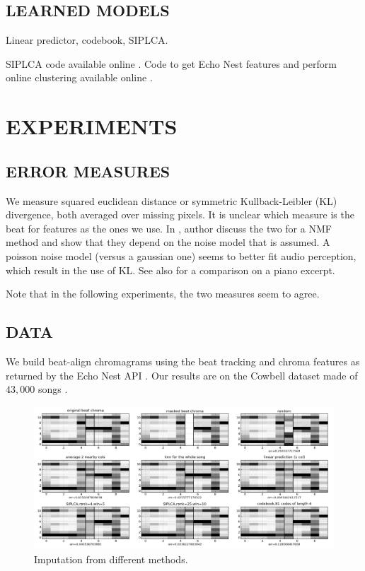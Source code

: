 \documentclass{article}
\begin{document}
\subsection{LEARNED MODELS}
\label{ssec:learnedmodels}

Linear predictor, codebook, SIPLCA.

SIPLCA code available online \cite{Weiss2010}. Code to get Echo Nest features and perform
online clustering available online \cite{Bertin-Mahieux2010a}.

\section{EXPERIMENTS}
\label{sec:experiments}

\subsection{ERROR MEASURES}
\label{ssec:errmeasures}
We measure squared euclidean distance or symmetric Kullback-Leibler (KL) divergence,
both averaged over missing pixels. It is unclear which measure is the beat for features
as the ones we use. In \cite{Sajda2003}, author discuss the two for
a NMF method and show that they depend on the noise model that is assumed.
A poisson noise model (versus a gaussian one) seems to better fit audio perception, 
which result in the use of KL. See also \cite{Fevotte2009} for a comparison on a piano
excerpt.

Note that in the following experiments, the two measures seem to agree.

\subsection{DATA}
\label{ssec:data}
We build beat-align chromagrams using the beat tracking and chroma features as
returned by the Echo Nest API \cite{EchoNest}. Our results are on the Cowbell
dataset made of $43,000$ songs \cite{Bertin-Mahieux2010a}.

\begin{figure}[t]
\begin{center}
\includegraphics[width=.9\columnwidth]{imputation}
\end{center}
\caption{Imputation from different methods.}
\label{fig:imputation}
\end{figure}
\end{document}
